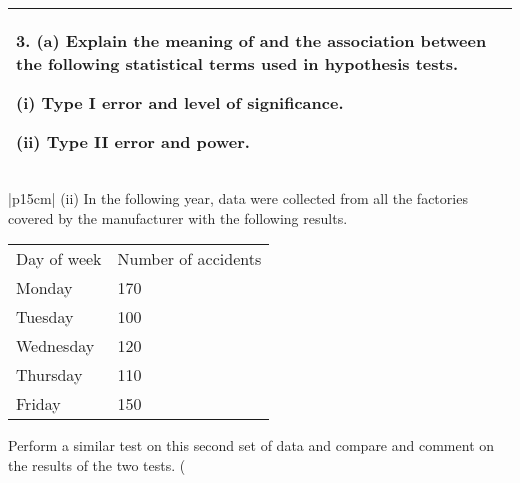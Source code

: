 \documentclass[a4paper,12pt]{article}
\begin{document}
\begin{table}[ht!]
 
\centering
 
\begin{tabular}{|p{15cm}|}
 
\hline  


3. (a) Explain the meaning of and the association between the following statistical terms used in hypothesis tests. 
 
  (i) Type I error and level of significance. 
 
  (ii) Type II error and power. 
 
 



\\ \hline
  
\end{tabular}

\end{table}
\begin{table}[ht!]
     \centering
     \begin{tabular}{|p{15cm}|}
     \hline  
 (ii) In the following year, data were collected from all the factories covered by the manufacturer with the following results. 
 
 
\begin{tabular}{ll}
Day of week  &  Number of accidents \\
Monday &  170 \\
Tuesday &  100 \\
Wednesday &  120 \\
Thursday &  110 \\
Friday &  150\\
\end{tabular}%
 
 
Perform a similar test on this second set of data and compare and comment on the results of the two tests. (
\\ \hline
      \end{tabular}
    \end{table}

  



       
\end{document}
